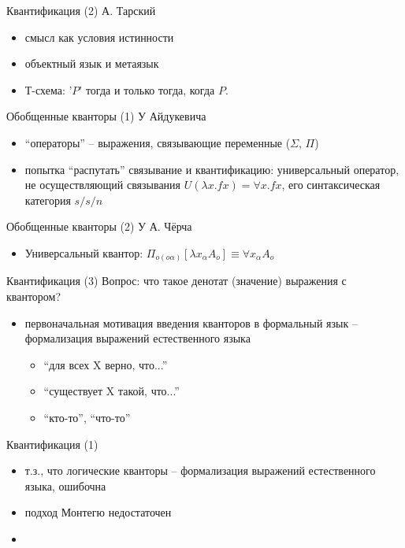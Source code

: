 \documentclass{beamer}
\begin{document}
\begin{frame}{Квантификация (2)}
А. Тарский
\begin{itemize}
	\item смысл как условия истинности 
	\item объектный язык и метаязык
	\item Т-схема: '$P$' тогда и только тогда, когда $P$.
\end{itemize}
\end{frame}

\begin{frame}{Обобщенные кванторы (1)}
У Айдукевича
\begin{itemize}
	\item ``операторы'' -- выражения, связывающие переменные ($\Sigma$, $\Pi$)
	\item попытка ``распутать'' связывание и квантификацию: универсальный оператор, не осуществляющий связывания $U(\lambda x . fx) = \forall x . fx$, его синтаксическая категория $s/s/n$
\end{itemize}
\end{frame}

\begin{frame}{Обобщенные кванторы (2)}
У А. Чёрча
\begin{itemize}
    \item Универсальный квантор: $\Pi_{o(o\alpha)}[\lambda x_\alpha A_o] \equiv \forall x_\alpha A_o$
\end{itemize}
\end{frame}


\begin{frame}{Квантификация (3)}
Вопрос: что такое денотат (значение) выражения с квантором?\\
\bigskip
\begin{itemize}
	\item первоначальная мотивация введения кванторов в формальный язык -- формализация выражений естественного языка
	\begin{itemize}
    	\item ``для всех X верно, что...''
	    \item ``существует X такой, что...''
	    \item ``кто-то'', ``что-то''
	\end{itemize}
\end{itemize}
\end{frame}

\begin{frame}{Квантификация (1)}
\begin{itemize}
	\item т.з., что логические кванторы -- формализация выражений естественного языка, ошибочна
	\item подход Монтегю недостаточен
	\item 
\end{itemize}
\end{frame}
\end{document}
